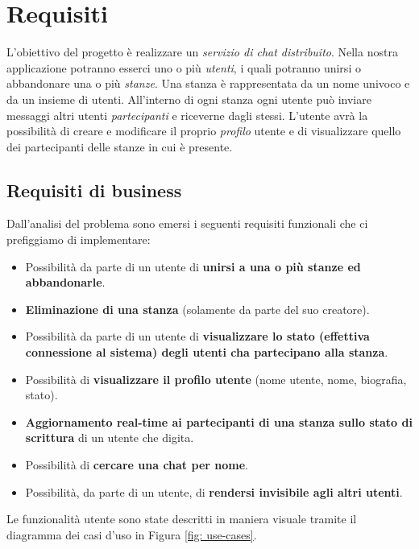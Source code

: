 \chapter{Requisiti}
L'obiettivo del progetto è realizzare un \textit{servizio di chat distribuito}. Nella nostra applicazione potranno esserci uno o più \textit{utenti}, i quali potranno unirsi o abbandonare una o più \textit{stanze}. Una stanza è rappresentata da un nome univoco e da un insieme di utenti. All'interno di ogni stanza ogni utente può inviare messaggi altri utenti \textit{partecipanti} e riceverne dagli stessi. L'utente avrà la possibilità di creare e modificare il proprio \textit{profilo} utente e di visualizzare quello dei partecipanti delle stanze in cui è presente. 

\section{Requisiti di business}
Dall'analisi del problema sono emersi i seguenti requisiti funzionali che ci prefiggiamo di implementare:
\begin{itemize}
    \item Possibilità da parte di un utente di \textbf{unirsi a una o più stanze ed abbandonarle}.
    \item \textbf{Eliminazione di una stanza} (solamente da parte del suo creatore).
    \item Possibilità da parte di un utente di \textbf{visualizzare lo stato (effettiva connessione al sistema) degli utenti cha partecipano alla stanza}.
    \item Possibilità di \textbf{visualizzare il profilo utente} (nome utente, nome, biografia, stato).
    \item \textbf{Aggiornamento real-time ai partecipanti di una stanza sullo stato di scrittura} di un utente che digita.
    \item Possibilità di \textbf{cercare una chat per nome}.
    \item Possibilità, da parte di un utente, di \textbf{rendersi invisibile agli altri utenti}.
\end{itemize}
Le funzionalità utente sono state descritti in maniera visuale tramite il diagramma dei casi d'uso in Figura \ref{fig: use-cases}.

